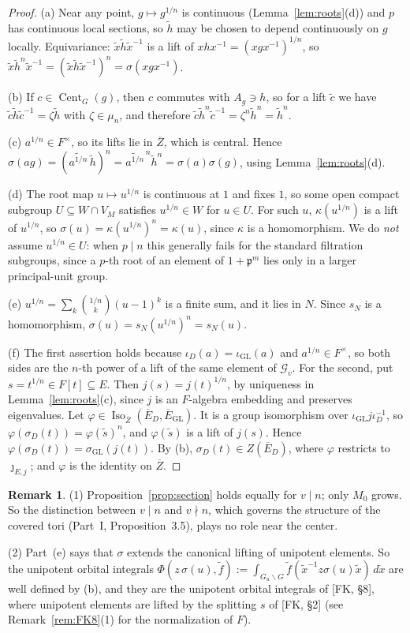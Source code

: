 \documentclass[12pt]{article}
\newcommand{\ov}[1]{\overline{#1}}
\newcommand{\fp}{\mathfrak{p}}
\newcommand{\Iso}{\operatorname{Iso}}
\newcommand{\Cent}{\operatorname{Cent}}
\newcommand{\GL}{\mathrm{GL}}
\newcommand{\Zb}{\ov{Z}}
\newcommand{\Eb}{\ov{E}}
\newcommand{\cG}{\mathcal{G}}
\newcommand{\iD}{\iota_D}
\newcommand{\iG}{\iota_{\GL}}
\newcommand{\jj}{\jmath}
\newcommand{\sg}{\sigma}
\theoremstyle{plain}
\theoremstyle{definition}
\newtheorem{remark}[theorem]{Remark}
\begin{document}
\begin{proof}
(a) Near any point, $g\mapsto g^{1/n}$ is continuous (Lemma~\ref{lem:roots}(d)) and $p$ has continuous local sections, so $\tilde h$ may be chosen to depend continuously on $g$ locally. Equivariance: $\tilde x\tilde h\tilde x^{-1}$ is a lift of $xhx^{-1}=(xgx^{-1})^{1/n}$, so $\tilde x\tilde h^n\tilde x^{-1}=(\tilde x\tilde h\tilde x^{-1})^n=\sg(xgx^{-1})$.

(b) If $c\in\Cent_G(g)$, then $c$ commutes with $A_g\ni h$, so for a lift $\tilde c$ we have $\tilde c\tilde h\tilde c^{-1}=\zeta\tilde h$ with $\zeta\in\mu_n$, and therefore $\tilde c\tilde h^n\tilde c^{-1}=\zeta^n\tilde h^n=\tilde h^n$.

(c) $a^{1/n}\in F^\times$, so its lifts lie in $\Zb$, which is central. Hence $\sg(ag)=(\widetilde{a^{1/n}}\,\tilde h)^n=\widetilde{a^{1/n}}^{\,n}\tilde h^n=\sg(a)\sg(g)$, using Lemma~\ref{lem:roots}(d).

(d) The root map $u\mapsto u^{1/n}$ is continuous at $1$ and fixes $1$, so some open compact subgroup $U\subseteq W\cap V_M$ satisfies $u^{1/n}\in W$ for $u\in U$. For such $u$, $\kappa(u^{1/n})$ is a lift of $u^{1/n}$, so $\sg(u)=\kappa(u^{1/n})^n=\kappa(u)$, since $\kappa$ is a homomorphism. We do \emph{not} assume $u^{1/n}\in U$: when $p\mid n$ this generally fails for the standard filtration subgroups, since a $p$-th root of an element of $1+\fp^m$ lies only in a larger principal-unit group.

(e) $u^{1/n}=\sum_k\binom{1/n}{k}(u-1)^k$ is a finite sum, and it lies in $N$. Since $s_N$ is a homomorphism, $\sg(u)=s_N(u^{1/n})^n=s_N(u)$.

(f) The first assertion holds because $\iD(a)=\iG(a)$ and $a^{1/n}\in F^\times$, so both sides are the $n$-th power of a lift of the same element of $\cG_v$. For the second, put $s=t^{1/n}\in F[t]\subseteq E$. Then $j(s)=j(t)^{1/n}$, by uniqueness in Lemma~\ref{lem:roots}(c), since $j$ is an $F$-algebra embedding and preserves eigenvalues. Let $\varphi\in\Iso_{\Zb}(\Eb_D,\Eb_{\GL})$. It is a group isomorphism over $\iG j\iD^{-1}$, so $\varphi(\sg_D(t))=\varphi(\tilde s)^n$, and $\varphi(\tilde s)$ is a lift of $j(s)$. Hence $\varphi(\sg_D(t))=\sg_{\GL}(j(t))$. By (b), $\sg_D(t)\in Z(\Eb_D)$, where $\varphi$ restricts to $\jj_{E,j}$; and $\varphi$ is the identity on $\Zb$.
\end{proof}

\begin{remark}
(1) Proposition~\ref{prop:section} holds equally for $v\mid n$; only $M_0$ grows. So the distinction between $v\mid n$ and $v\nmid n$, which governs the structure of the covered tori (Part~I, Proposition~3.5), plays no role near the center.

(2) Part~(e) says that $\sg$ extends the canonical lifting of unipotent elements. So the unipotent orbital integrals $\Phi(z\,\sg(u),\tilde f):=\int_{G_u\backslash G}\tilde f(\tilde x^{-1}z\sg(u)\tilde x)\,d\dot x$ are well defined by (b), and they are the unipotent orbital integrals of [FK, \S8], where unipotent elements are lifted by the splitting $s$ of [FK, \S2] (see Remark~\ref{rem:FK8}(1) for the normalization of $F$).
\end{remark}
\end{document}

